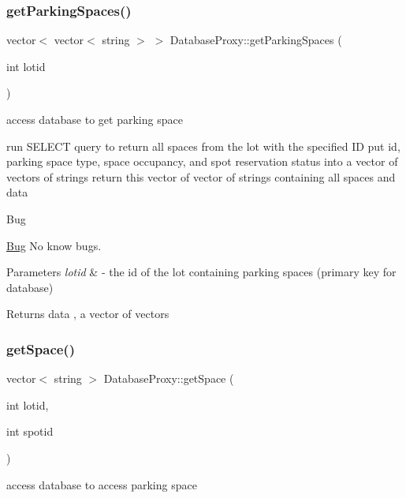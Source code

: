 \subsubsection{\texorpdfstring{get\+Parking\+Spaces()}{getParkingSpaces()}}
{\footnotesize\ttfamily vector$<$ vector$<$ string $>$ $>$ Database\+Proxy\+::get\+Parking\+Spaces (\begin{DoxyParamCaption}\item[{int}]{lotid }\end{DoxyParamCaption})}



access database to get parking space 

run S\+E\+L\+E\+CT query to return all spaces from the lot with the specified ID put id, parking space type, space occupancy, and spot reservation status into a vector of vectors of strings return this vector of vector of strings containing all spaces and data

\begin{DoxyRefDesc}{Bug}
\item[\mbox{\hyperlink{bug__bug000014}{Bug}}]No know bugs. \end{DoxyRefDesc}

\begin{DoxyParams}{Parameters}
{\em lotid} & -\/ the id of the lot containing parking spaces (primary key for database) \\
\hline
\end{DoxyParams}
\begin{DoxyReturn}{Returns}
data , a vector of vectors 
\end{DoxyReturn}
\mbox{\label{class_database_proxy_ae62e46fed10eecba9b13afd65874d750}} 
\subsubsection{\texorpdfstring{get\+Space()}{getSpace()}}
{\footnotesize\ttfamily vector$<$ string $>$ Database\+Proxy\+::get\+Space (\begin{DoxyParamCaption}\item[{int}]{lotid,  }\item[{int}]{spotid }\end{DoxyParamCaption})}



access database to access parking space 

